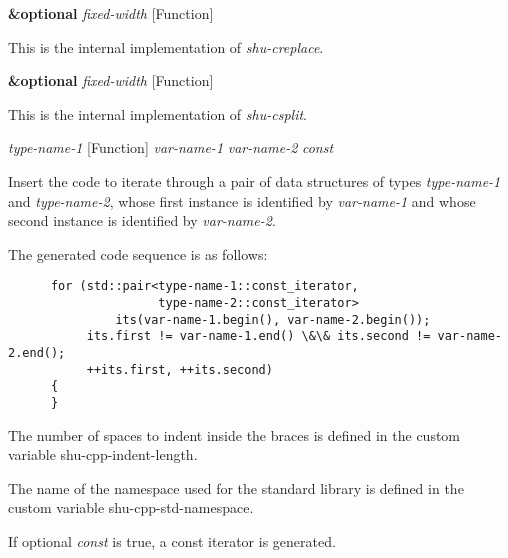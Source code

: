 \vspace{1em}
\noindent
{}
\usebox{\funcname}\textbf{\&optional} \emph{fixed-width}
 \hfill [Function]

\begin{doc-string}
This is the internal implementation of \emph{shu-creplace}.
\end{doc-string}

\vspace{1em}
\noindent
{}
\usebox{\funcname}\textbf{\&optional} \emph{fixed-width}
 \hfill [Function]

\begin{doc-string}
This is the internal implementation of \emph{shu-csplit}.
\end{doc-string}

\vspace{1em}
\noindent
{}
\usebox{\funcname}\emph{type-name-1}
 \hfill [Function]
\hspace*{\wd\funcname}\emph{var-name-1} \emph{var-name-2}
\hspace*{\wd\funcname}\emph{const}

\begin{doc-string}
Insert the code to iterate through a pair of data structures of types
\emph{type-name-1} and \emph{type-name-2}, whose first instance is identified by \emph{var-name-1}
and whose second instance is identified by \emph{var-name-2}.

The generated code sequence is as follows:

\small{\begin{verbatim}
      for (std::pair<type-name-1::const_iterator,
                     type-name-2::const_iterator>
               its(var-name-1.begin(), var-name-2.begin());
           its.first != var-name-1.end() \&\& its.second != var-name-2.end();
           ++its.first, ++its.second)
      {
      }
\end{verbatim}}

The number of spaces to indent inside the braces is defined in the custom
variable shu-cpp-indent-length.

The name of the namespace used for the standard library is defined in the custom
variable shu-cpp-std-namespace.

If optional \emph{const} is true, a const iterator is generated.
\end{doc-string}

